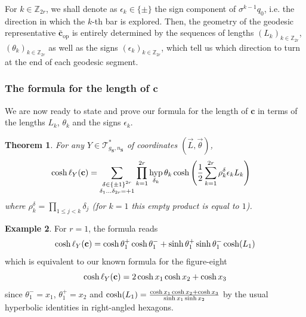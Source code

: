 \documentclass[12pt,twoside]{article}
\theoremstyle{theorem}
\newtheorem{thm}{Theorem}[section]
\theoremstyle{remark}
\theoremstyle{definition}
\theoremstyle{example}
\newtheorem{expl}[thm]{Example}
\newcommand{\Z}{\mathbb{Z}}
\newcommand{\1}[1]{\mathds{1}_{#1}}
\let\div\relax
\newcommand{\div}[1]{\left(\frac{#1}{2}\right)}
\newcommand{\g}{g_{\mathbf{S}}}
\newcommand{\n}{n_{\mathbf{S}}}
\newcommand{\copg}{{\bar{\mathbf{c}}}_{\mathrm{op}}}
\newcommand{\curve}{\mathbf{c}}
\DeclareMathOperator{\hyp}{hyp}
\begin{document}
For $k \in \Z_{2r}$, we shall denote as $\epsilon_k \in \{\pm\}$ the sign component of
$\sigma^{k-1} q_0$, i.e. the direction in which the $k$-th bar is explored. Then, the geometry of
the geodesic representative $\copg$ is entirely determined by the sequences of lengths $(L_k)_{k \in
\Z_{2r}}$, $(\theta_k)_{k \in \Z_{2r}}$ as well as the signs $(\epsilon_k)_{k \in \Z_{2r}}$, which
tell us which direction to turn at the end of each geodesic segment.



\subsubsection{The formula for the length of $\mathbf{c}$}

We are now ready to state and prove our formula for the length of $\mathbf{c}$ in terms of the
lengths $L_k$, $\theta_k$ and the signs $\epsilon_k$.

\begin{thm}
  \label{prop:form_l_gamma_try}
   For any $Y \in \mathcal{T}_{\g,\n}^*$ of coordinates
  $(\vec{L},\vec{\theta})$, 
  \begin{align*}
    \cosh \div{\ell_Y({\mathbf{c}})}
    & = \sum_{\substack{\delta \in \{ \pm 1 \}^{2r} \\ \delta_1 \ldots \delta_{2r} = +1}}
    \prod_{k=1}^{2r} \hyp_{\delta_k} \div {\theta_k} \cosh
    \left(
    \frac 12
    \sum_{k=1}^{2r} \rho^\delta_k \epsilon_k L_k 
    \right)
  \end{align*}
  where $\rho^\delta_k = \prod_{1 \leq j<k} \delta_{j}$ (for $k=1$ this empty product is equal to
  $1$).
\end{thm}

\begin{expl}
  For $r=1$, the formula reads
  \begin{equation*}
    \cosh \div{\ell_Y(\curve)}
    = \cosh \div{\theta_1^+}\cosh \div{\theta_1^-}
    + \sinh \div{\theta_1^+}\sinh \div{\theta_1^-} \cosh(L_1)
  \end{equation*}
  which is equivalent to our known formula for the figure-eight
  \begin{equation*}
    \cosh \div{\ell_Y(\curve)}
    = 2 \cosh \div{x_1}\cosh \div{x_2}
    + \cosh\div{x_3}
  \end{equation*}
  since $\theta_1^-=x_1$, $\theta_1^+=x_2$ and
  $
    \cosh(L_1) = \frac{\cosh \div{x_1} \cosh \div{x_2}
    + \cosh \div{x_3}}{\sinh \div{x_1} \sinh \div{x_2}}$
by the usual hyperbolic identities in right-angled hexagons.
\end{expl}
\end{document}
